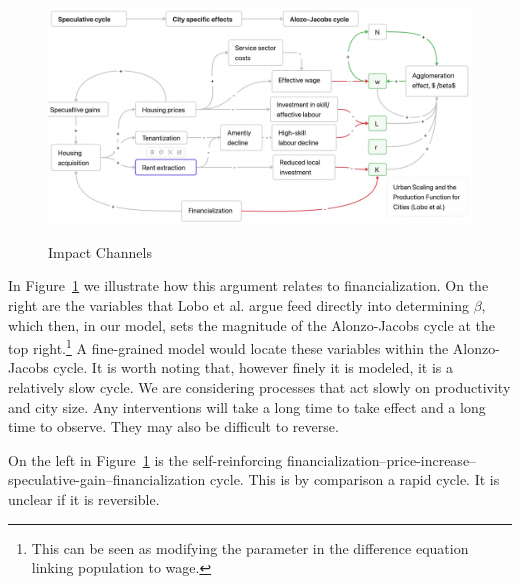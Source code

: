 {\newpage\thispagestyle{empty}
\vspace{-1.5cm}
\begin{figure}
\vspace{-1cm}
\caption{Impact Channels}
\begin{adjustwidth}{-0.24\textwidth}{-0.24\textwidth}
    \centering
    \includegraphics[scale=.45, angle=90]{fig/impact_channels_revised.png}
    \label{fig-impact-channels}
\end{adjustwidth}
\end{figure}
}


 In Figure~\ref{fig-impact-channels} we illustrate how this argument relates to financialization. On the right are the variables that  Lobo et al. \cite{loboUrbanScalingProduction2013} argue feed directly into determining $\beta$, which then, in our model, sets the magnitude of the \gls{Alonzo-Jacobs cycle} at the top right.\footnote{This can be seen as modifying  the parameter in  the difference equation linking population to wage.} A fine-grained model would locate these variables within the Alonzo-Jacobs cycle. It is worth noting that, however finely it is modeled, it is  a relatively slow cycle. We are considering processes that act slowly on productivity and city size. Any interventions will take a long time to take effect and a long time to observe. They may also be difficult to reverse. 
 
 
 On the left in Figure~\ref{fig-impact-channels} is the self-reinforcing financialization--price-increase-- speculative-gain--financialization cycle. This is by comparison a rapid cycle. It is unclear if it is reversible. 
 
